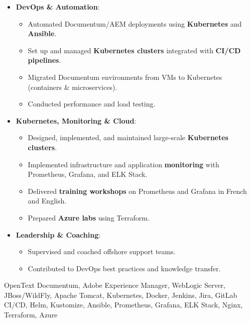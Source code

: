\begin{experiences}
{\begin{itemize}[left=0pt,label={},itemsep=0.5em]
          \item \textbf{DevOps \& Automation}:
            \begin{itemize}[itemsep=0.2em,topsep=0.2em,parsep=0pt]
              \small
              \item Automated Documentum/AEM deployments using \textbf{Kubernetes} and \textbf{Ansible}.
              \item Set up and managed \textbf{Kubernetes clusters} integrated with \textbf{CI/CD pipelines}.
              \item Migrated Documentum environments from VMs to Kubernetes (containers \& microservices).
              \item Conducted performance and load testing.
            \end{itemize}

          \item \textbf{Kubernetes, Monitoring \& Cloud}:
            \begin{itemize}[itemsep=0.2em,topsep=0.2em,parsep=0pt]
              \small
              \item Designed, implemented, and maintained large-scale \textbf{Kubernetes clusters}.
              \item Implemented infrastructure and application \textbf{monitoring} with Prometheus, Grafana, and ELK Stack.
              \item Delivered \textbf{training workshops} on Prometheus and Grafana in French and English.
              \item Prepared \textbf{Azure labs} using Terraform.
            \end{itemize}

          \item \textbf{Leadership \& Coaching}:
            \begin{itemize}[itemsep=0.2em,topsep=0.2em,parsep=0pt]
              \small
              \item Supervised and coached offshore support teams.
              \item Contributed to DevOps best practices and knowledge transfer.
            \end{itemize}

        \end{itemize}
    }
    {OpenText Documentum, Adobe Experience Manager, WebLogic Server, JBoss/WildFly, Apache Tomcat, Kubernetes, Docker, Jenkins, Jira, GitLab CI/CD, Helm, Kustomize, Ansible, Prometheus, Grafana, ELK Stack, Nginx, Terraform, Azure}


\end{experiences}
